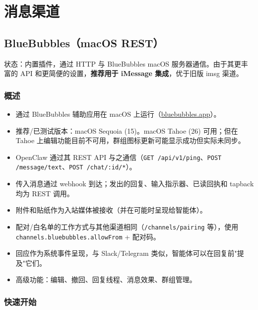\chapter{消息渠道}

\section{BlueBubbles（macOS REST）}


状态：内置插件，通过 HTTP 与 BlueBubbles macOS 服务器通信。由于其更丰富的 API 和更简便的设置，\textbf{推荐用于 iMessage 集成}，优于旧版 imsg 渠道。

\subsection{概述}


\begin{itemize}
  \item 通过 BlueBubbles 辅助应用在 macOS 上运行（\href{https://bluebubbles.app}{bluebubbles.app}）。
  \item 推荐/已测试版本：macOS Sequoia (15)。macOS Tahoe (26) 可用；但在 Tahoe 上编辑功能目前不可用，群组图标更新可能显示成功但实际未同步。
  \item OpenClaw 通过其 REST API 与之通信（\texttt{GET /api/v1/ping}、\texttt{POST /message/text}、\texttt{POST /chat/:id/*}）。
  \item 传入消息通过 webhook 到达；发出的回复、输入指示器、已读回执和 tapback 均为 REST 调用。
  \item 附件和贴纸作为入站媒体被接收（并在可能时呈现给智能体）。
  \item 配对/白名单的工作方式与其他渠道相同（\texttt{/channels/pairing} 等），使用 \texttt{channels.bluebubbles.allowFrom} + 配对码。
  \item 回应作为系统事件呈现，与 Slack/Telegram 类似，智能体可以在回复前"提及"它们。
  \item 高级功能：编辑、撤回、回复线程、消息效果、群组管理。
\end{itemize}


\subsection{快速开始}


